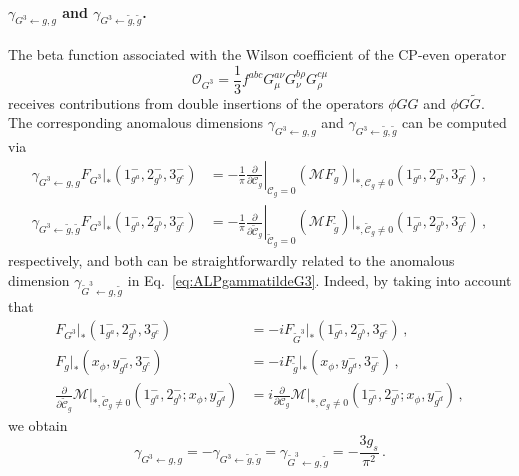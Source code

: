 \paragraph{\texorpdfstring{$\gamma_{G^3\leftarrow g, g}$ and $\gamma_{G^3\leftarrow \tilde g, \tilde g}$}{gamma G3 from gg and gtilde gtilde}.}
\label{par:ALPGGG}
The beta function associated with the Wilson coefficient of the CP-even operator
\begin{equation}
    \mathcal O_{G^3} = \frac{1}{3}f^{abc}G_\mu^{a \nu} G_{\nu}^{b \rho} G_{\rho}^{c \mu}
\end{equation}
receives contributions from double insertions of the operators $\phi GG$ and
$\phi G\widetilde G$.
The corresponding anomalous dimensions $\gamma_{ G^3\leftarrow g, g}$ and
$\gamma_{ G^3\leftarrow \tilde g,\tilde g}$ can be computed via
\begin{align}
    \gamma_{ G^3\leftarrow g, g}F_{ G^3}|_*(1^-_{g^a},2^-_{g^b},3^-_{g^c})&=-\frac{1}{\pi}\left. \frac{\partial}{\partial \mathcal C_g} \right|_{\mathcal C_g = 0} (\mathcal M F_{g})|_{*,\mathcal C_g \neq  0}(1^-_{g^a},2^-_{g^b},3^-_{g^c})\,, \\
    \gamma_{ G^3\leftarrow \tilde g,\tilde g}F_{ G^3}|_*(1^-_{g^a},2^-_{g^b},3^-_{g^c})&=-\frac{1}{\pi}\left. \frac{\partial}{\partial \widetilde{\mathcal{C}}_g} \right|_{\widetilde{\mathcal{C}}_g = 0} (\mathcal M F_{\tilde g})|_{*,\widetilde{\mathcal{C}}_g \neq  0}(1^-_{g^a},2^-_{g^b},3^-_{g^c})\,,
\end{align}
respectively, and both can be straightforwardly related to the anomalous dimension
$\gamma_{\tilde G^3\leftarrow g,\tilde g}$ in Eq.~\eqref{eq:ALPgammatildeG3}.
Indeed, by taking into account that
\begin{align}
    F_{ G^3}|_*(1^-_{g^a},2^-_{g^b},3^-_{g^c}) &= -i F_{\tilde G^3}|_*(1^-_{g^a},2^-_{g^b},3^-_{g^c})\,, \\
    F_{g}|_*(x_\phi,y^-_{g^d},3^-_{g^c}) &=-i F_{\tilde g}|_*(x_\phi,y^-_{g^d},3^-_{g^c})\,,\\
    \frac{\partial}{\partial \widetilde{\mathcal{C}}_g}\mathcal{M}|_{*,\widetilde{\mathcal{C}}_g \neq  0}(1^-_{g^a},2^-_{g^b};x_\phi,y^-_{g^d})&= i \frac{\partial}{\partial \mathcal{C}_g} \mathcal{M}|_{*,\mathcal C_g \neq  0}(1^-_{g^a},2^-_{g^b};x_\phi,y^-_{g^d})\,,
\end{align}
we obtain
\begin{equation}
\label{eq:ALPGGG_AD}
    \gamma_{ G^3\leftarrow g, g} =- \gamma_{ G^3\leftarrow \tilde g, \tilde g} = \gamma_{ \tilde G^3\leftarrow g, \tilde g} = -\frac{3g_s}{\pi^2}\,.
\end{equation}

